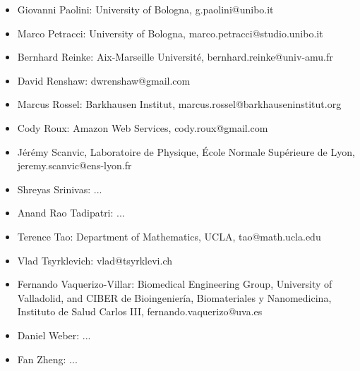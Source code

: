 \begin{itemize}
    \item Giovanni Paolini: University of Bologna, g.paolini@unibo.it
    \item Marco Petracci: University of Bologna, marco.petracci@studio.unibo.it
    \item Bernhard Reinke: Aix-Marseille Université, bernhard.reinke@univ-amu.fr
    \item David Renshaw: dwrenshaw@gmail.com
    \item Marcus Rossel: Barkhausen Institut, marcus.rossel@barkhauseninstitut.org
    \item Cody Roux: Amazon Web Services, cody.roux@gmail.com
    \item J\'er\'emy Scanvic, Laboratoire de Physique, École Normale Supérieure de Lyon, jeremy.scanvic@ens-lyon.fr
    \item Shreyas Srinivas: ...
    \item Anand Rao Tadipatri: ...
    \item Terence Tao: Department of Mathematics, UCLA, tao@math.ucla.edu
    \item Vlad Tsyrklevich: vlad@tsyrklevi.ch
    \item Fernando Vaquerizo-Villar: Biomedical Engineering Group, University of Valladolid, and CIBER de Bioingeniería, Biomateriales y Nanomedicina, Instituto de Salud Carlos III, fernando.vaquerizo@uva.es
    \item Daniel Weber: ...
    \item Fan Zheng: ...

\end{itemize}
